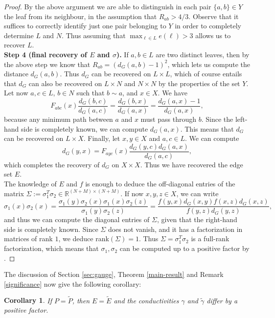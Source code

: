 \documentclass[a4paper,11pt,oneside]{amsart}
\newtheorem{corollary}[theorem]{Corollary}
\newcommand{\R}{{\mathbb R}}
\begin{document}
\begin{proof}
\noindent By the above argument we are able to distinguish in each pair $\{a,b\}\in Y$ the leaf from its neighbour, in the assumption that $R_{ab}>4/3$. Observe that it suffices to correctly identify just one pair belonging to $Y$ in order to completely determine $L$ and $N$. Thus assuming that $\max_{\ell \in L} e(\ell) > 3$ allows us to recover $L$. 
\\

\textbf{Step 4 (final recovery of $E$ and $\sigma$).} If $a,b\in L$ are two distinct leaves, then by the above step we know that $R_{ab} = (d_G(a,b)-1)^2$, which lets us compute the distance $d_G(a,b)$. Thus $d_G$ can be recovered on $L\times L$, which of course entails that $d_G$ can also be recovered on $L\times N$ and $N\times N$ by the properties of the set $Y$. Let now $a,c\in L$, $b\in N$ such that $b\sim a$, and $x\in X$. We have
$$F_{abc}(x)\frac{d_G(b,c)}{d_G(a,c)} = \frac{d_G(b,x)}{d_G(a,x)} = \frac{d_G(a,x)-1}{d_G(a,x)}, $$
because any minimum path between $a$ and $x$ must pass through $b$. Since the left-hand side is completely known, we can compute $d_G(a,x)$. This means that $d_G$ can be recovered on $L\times X$. Finally, let $x,y\in X$ and $a,c\in L$. We can compute
$$d_G(y,x)=F_{ayc}(x)\frac{d_G(y,c)d_G(a,x)}{d_G(a,c)}, $$
which completes the recovery of $d_G$ on $X\times X$. Thus we have recovered the edge set $E$.
\\

The knowledge of $E$ and $f$ is enough to deduce the off-diagonal entries of the matrix $\Sigma := \sigma_1^T\sigma_2 \in \R^{(N+M)\times (N+M)}$. If now $x,y,z\in X$, we can write
$$ \sigma_1(x)\sigma_2(x) = \frac{\sigma_1(y)\sigma_2(x) \sigma_1(x)\sigma_2(z)}{\sigma_1(y)\sigma_2(z)}= \frac{f(y,x)d_G(x,y) f(x,z)d_G(x,z)}{f(y,z)d_G(y,z)}, $$
and thus we can compute the diagonal entries of $\Sigma$, given that the right-hand side is completely known. Since $\Sigma$ does not vanish, and it has a factorization in matrices of rank $1$, we deduce rank$(\Sigma)=1$. Thus $\Sigma = \sigma_1^T\sigma_2$ is a full-rank factorization, which means that $\sigma_1, \sigma_2$ can be computed up to a positive factor by \cite[Theorem 2]{PO99}. 
\end{proof}

The discussion of Section \ref{sec:gauge}, Theorem \ref{main-result} and Remark \ref{significance} now give the following corollary:

\begin{corollary}\label{cor:use-main-theorem}
    If $P=\tilde P$, then $E=\tilde E$ and the conductivities $\gamma$ and $\tilde \gamma$ differ by a positive factor.
\end{corollary}
\end{document}
